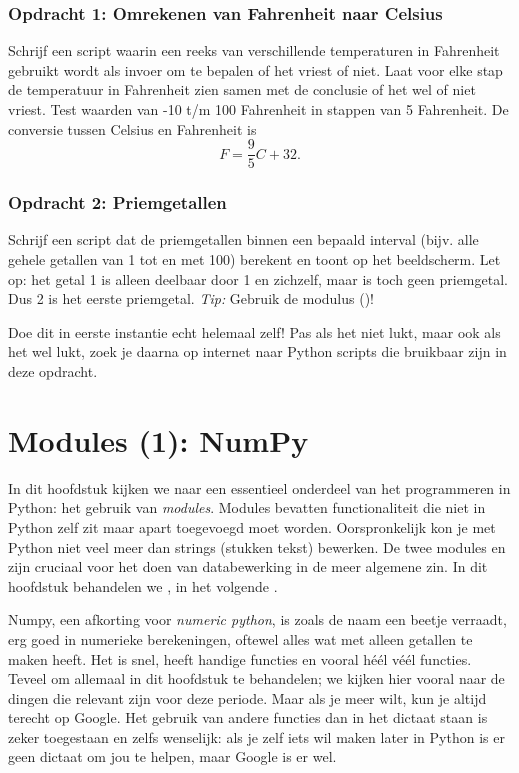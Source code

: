\documentclass[a4paper,11pt, fleqn]{article}
\newcommand{\ditwc}{Naam van het huidige werkcollege}
\begin{document}
\subsubsection{Opdracht 1: Omrekenen van Fahrenheit naar Celsius}
Schrijf een script waarin een reeks van verschillende temperaturen in Fahrenheit gebruikt wordt als invoer om te bepalen of het vriest of niet. Laat voor elke stap de temperatuur in Fahrenheit zien samen met de conclusie of het wel of niet vriest. Test waarden van -10 t/m 100 Fahrenheit in stappen van 5 Fahrenheit. De conversie tussen Celsius en Fahrenheit is
\begin{equation}
F = \frac{9}{5} C + 32.
\end{equation}

\subsubsection{Opdracht 2: Priemgetallen}
Schrijf een script dat de priemgetallen binnen een bepaald interval (bijv. alle gehele getallen van 1 tot en met 100) berekent en toont op het beeldscherm. Let op: het getal 1 is alleen deelbaar door 1 en zichzelf, maar is toch geen priemgetal. Dus 2 is het eerste priemgetal. \textit{Tip:} Gebruik de modulus (\pythoninline{\%})!

Doe dit in eerste instantie echt helemaal zelf! Pas als het niet lukt, maar ook als het wel lukt, zoek je daarna op internet naar Python scripts die bruikbaar zijn in deze opdracht. 

\clearpage
\renewcommand{\ditwc}{Modules (1): NumPy}
\section[Modules (1): NumPy]{\ditwc}
In dit hoofdstuk kijken we naar een essentieel onderdeel van het programmeren in Python: het gebruik van {\it modules}. Modules bevatten functionaliteit die niet in Python zelf zit maar apart toegevoegd moet worden. Oorspronkelijk kon je met Python niet veel meer dan strings (stukken tekst) bewerken. De twee modules  en  zijn cruciaal voor het doen van databewerking in de meer algemene zin. In dit hoofdstuk behandelen we , in het volgende .

Numpy, een afkorting voor {\it numeric python}, is zoals de naam een beetje verraadt, erg goed in numerieke berekeningen, oftewel alles wat met alleen getallen te maken heeft. Het is snel, heeft handige functies en vooral h\'e\'el v\'e\'el functies. Teveel om allemaal in dit hoofdstuk te behandelen; we kijken hier vooral naar de dingen die relevant zijn voor deze periode. Maar als je meer wilt, kun je altijd terecht op Google. Het gebruik van andere functies dan in het dictaat staan is zeker toegestaan en zelfs wenselijk: als je zelf iets wil maken later in Python is er geen dictaat om jou te helpen, maar Google is er wel.
\end{document}
